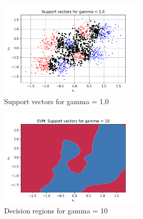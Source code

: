 \documentclass[a4paper]{article}    %
\begin{document}
\begin{figure}[H]
\begin{subfigure}{0.45\textwidth}
    \end{subfigure}
    \hfill
    \begin{subfigure}{0.45\textwidth}
        \centering
        \includegraphics[width=7cm]{support_vectors_gamma_1}
        \caption{Support vectors for gamma = 1.0}
        \label{fig:svm-support_vectors_gamma_1}
    \end{subfigure}
    \begin{subfigure}{0.45\textwidth}
        \centering
        \includegraphics[width=7cm]{decision_region_gamma_10}
        \caption{Decision regions for gamma = 10}
        \label{fig:svm-decision_region_gamma_10}
    \end{subfigure}
    \hfill
    \begin{subfigure}{0.45\textwidth}

\end{subfigure}
\end{figure}
\end{document}
